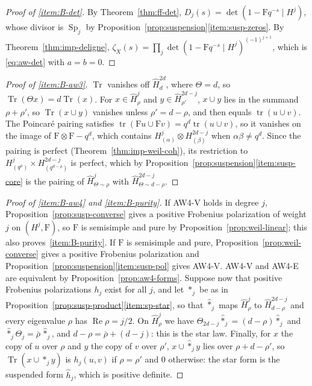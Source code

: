 \documentclass[11pt]{amsart}
\theoremstyle{plain}
\theoremstyle{definition}
\theoremstyle{remark}
\numberwithin{equation}{section}
\DeclareMathOperator{\Tr}{Tr}
\DeclareMathOperator{\Rea}{Re}
\renewcommand{\Re}{\Rea}
\begin{document}
\begin{proof}[Proof of \ref{item:B-det}]
By Theorem~\ref{thm:ff-det}, $D_j(s)=\det(1-\mathrm{F}q^{-s}\mid H^j)$,
whose divisor is $\operatorname{Sp}_j$ by
Proposition~\ref{prop:suspension}\ref{item:susp-zeros}. By
Theorem~\ref{thm:imp-deligne},
$\zeta_X(s)=\prod_j\det(1-\mathrm{F}q^{-s}\mid H^j)^{(-1)^{j+1}}$,
which is \eqref{eq:aw-det} with $a=b=0$.
\end{proof}

\begin{proof}[Proof of \ref{item:B-aw3}]
$\Tr$ vanishes off $\widehat H^{2d}_d$, where $\Theta=d$, so
$\Tr(\Theta x)=d\Tr(x)$. For $x\in\widehat H^j_\rho$ and
$y\in\widehat H^{2d-j}_{\rho'}$, $x\cup y$ lies in the summand
$\rho+\rho'$, so $\Tr(x\cup y)$ vanishes unless $\rho'=d-\rho$, and
then equals $\operatorname{tr}(u\cup v)$. The Poincar\'e pairing
satisfies $\operatorname{tr}(\mathrm{F}u\cup\mathrm{F}v)=
q^d\operatorname{tr}(u\cup v)$, so it vanishes on the image of
$\mathrm{F}\otimes\mathrm{F}-q^d$, which contains
$H^j_{(\alpha)}\otimes H^{2d-j}_{(\beta)}$ when $\alpha\beta\ne q^d$.
Since the pairing is perfect (Theorem~\ref{thm:imp-weil-coh}), its
restriction to $H^j_{(q^\rho)}\times H^{2d-j}_{(q^{d-\rho})}$ is
perfect, which by Proposition~\ref{prop:suspension}\ref{item:susp-core}
is the pairing of $\widehat H^j_{\Theta\sim\rho}$ with
$\widehat H^{2d-j}_{\Theta\sim d-\rho}$.
\end{proof}

\begin{proof}[Proof of \ref{item:B-aw4} and \ref{item:B-purity}]
If AW4-V holds in degree $j$, Proposition~\ref{prop:susp-converse}
gives a positive Frobenius polarization of weight $j$ on
$(H^j,\mathrm{F})$, so $\mathrm{F}$ is semisimple and pure by
Proposition~\ref{prop:weil-linear}; this also
proves~\ref{item:B-purity}. If $\mathrm{F}$ is semisimple and pure,
Proposition~\ref{prop:weil-converse} gives a positive Frobenius
polarization and Proposition~\ref{prop:suspension}\ref{item:susp-pol}
gives AW4-V. AW4-V and AW4-E are equivalent by
Proposition~\ref{prop:aw4-forms}. Suppose now that positive Frobenius
polarizations $h_j$ exist for all $j$, and let $*_j$ be as in
Proposition~\ref{prop:susp-product}\ref{item:sp-star}, so that
$\widehat*_j$ maps $\widehat H^j_\rho$ to $\widehat H^{2d-j}_{d-\rho}$
and every eigenvalue $\rho$ has $\Re\rho=j/2$. On $\widehat H^j_\rho$ we have
$\Theta_{2d-j}\widehat*_j=
(d-\rho)\widehat*_j$ and $\widehat*_j\Theta_j=\bar\rho\,\widehat*_j$,
and $d-\rho=\bar\rho+(d-j)$: this is the star law. Finally, for $x$ the
copy of $u$ over $\rho$ and $y$ the copy of $v$ over $\rho'$,
$x\cup\widehat*_jy$ lies over $\rho+d-\rho'$, so $\Tr(x\cup
\widehat*_jy)$ is $h_j(u,v)$ if $\rho=\rho'$ and $0$ otherwise: the
star form is the suspended form $\widehat h_j$, which is positive
definite.
\end{proof}
\end{document}
